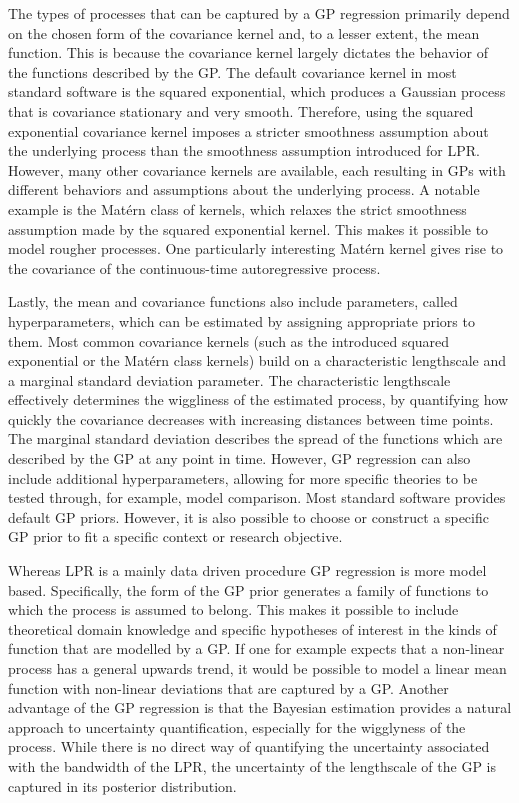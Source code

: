 \documentclass[man, floatsintext]{apa7}
\begin{document}
\noindent The types of processes that can be captured by a GP regression
primarily depend on the chosen form of the covariance kernel and, to a lesser
extent, the mean function. This is because the covariance kernel largely
dictates the behavior of the functions described by the GP\@. The default
covariance kernel in most standard software is the squared exponential, which
produces a Gaussian process that is covariance stationary and very smooth.
Therefore, using the squared exponential covariance kernel imposes a stricter
smoothness assumption about the underlying process than the smoothness
assumption introduced for LPR\@. However, many other covariance kernels are
available, each resulting in GPs with different behaviors and assumptions about
the underlying process. A notable example is the Matérn class of kernels, which
relaxes the strict smoothness assumption made by the squared exponential
kernel. This makes it possible to model rougher processes. One particularly
interesting Matérn kernel gives rise to the covariance of the continuous-time
autoregressive process.

Lastly, the mean and covariance functions also include parameters, called
hyperparameters, which can be estimated by assigning appropriate priors to
them. Most common covariance kernels (such as the introduced squared
exponential or the Matérn class kernels) build on a characteristic lengthscale
and a marginal standard deviation parameter. The characteristic lengthscale
effectively determines the wiggliness of the estimated process, by quantifying
how quickly the covariance decreases with increasing distances between time
points. The marginal standard deviation describes the spread of the functions
which are described by the GP at any point in time. However, GP regression can
also include additional hyperparameters, allowing for more specific theories to
be tested through, for example, model comparison. Most standard software
provides default GP priors. However, it is also possible to choose or
construct a specific GP prior to fit a specific context or research objective.

Whereas LPR is a mainly data driven procedure GP regression is more model
based. Specifically, the form of the GP prior generates a family of functions
to which the process is assumed to belong. This makes it possible to include
theoretical domain knowledge and specific hypotheses of interest in the kinds
of function that are modelled by a GP\@. If one for example expects that a
non-linear process has a general upwards trend, it would be possible to model a
linear mean function with non-linear deviations that are captured by a GP\@.
Another advantage of the GP regression is that the Bayesian estimation provides
a natural approach to uncertainty quantification, especially for the wigglyness
of the process. While there is no direct way of quantifying the uncertainty
associated with the bandwidth of the LPR, the uncertainty of the lengthscale of
the GP is captured in its posterior distribution.
\end{document}
